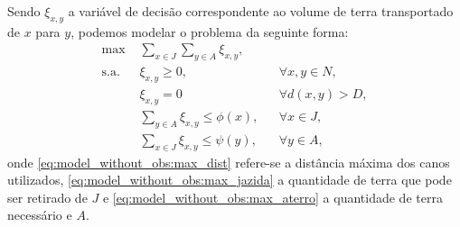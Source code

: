 Sendo $\xi_{x,y}$ a variável de decisão correspondente ao volume de terra
transportado de $x$ para $y$, podemos modelar o problema da seguinte forma:
\begin{subequations}
    \begin{align}
        \text{max } & \sum_{x \in J} \sum_{y \in A} \xi_{x,y},
        \label{eq:model_without_obs:obj_func} \\
        \text{s.a. } & \xi_{x,y} \geq 0, && \forall x, y \in N,
        \label{eq:model_without_obs:var} \\
        & \xi_{x,y} = 0 && \forall d(x,y) > D,
        \label{eq:model_without_obs:max_dist} \\
        & \sum_{y \in A} \xi_{x,y} \leq \phi(x), && \forall x \in J,
        \label{eq:model_without_obs:max_jazida} \\
        & \sum_{x \in J} \xi_{x,y} \leq \psi(y), && \forall y \in A,
        \label{eq:model_without_obs:max_aterro}
    \end{align}
    \label{eq:model_without_obs}
\end{subequations}
onde \eqref{eq:model_without_obs:max_dist} refere-se a distância máxima dos
canos utilizados, \eqref{eq:model_without_obs:max_jazida} a quantidade de terra
que pode ser retirado de $J$ e \eqref{eq:model_without_obs:max_aterro} a
quantidade de terra necessário e $A$.

